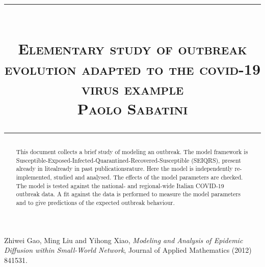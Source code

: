 \documentclass{article}
\title{
\begin{flushleft}
\rule{\textwidth}{1pt}\\
  \textsc{\textbf{Elementary study of outbreak evolution adapted to the covid-19 virus example 	}}\\[2mm]
\textsc{\large Paolo Sabatini}\\
\rule{\textwidth}{1pt}
  \end{flushleft}
}
\date{}
\begin{document}
\maketitle


\begin{abstract}
This document collects a brief study of modeling an outbreak. The model framework is Susceptible-Exposed-Infected-Quarantined-Recovered-Susceptible (SEIQRS), present already in litealready in past publicationsrature. Here the model is independently re-implemented, studied and analysed. The effects of the model parameters are checked. The model is tested against the national- and regional-wide Italian COVID-19 outbreak data. A fit against the data is performed to measure the model parameters and to give predictions of the expected outbreak behaviour.
\end{abstract}
\vspace{2cm}
\tableofcontents

\newpage





\begin{thebibliography}{9}
Zhiwei Gao, Ming Liu and Yihong Xiao, 
\textit{Modeling and Analysis of Epidemic Diffusion within Small-World Network},
Journal of Applied Mathematics (2012) 841531.
\end{thebibliography}
\end{document}
